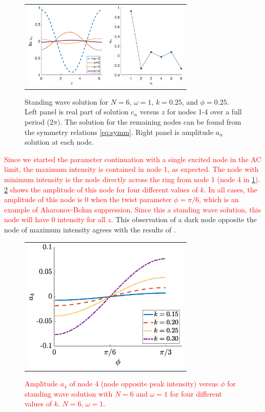 \documentclass[reprint, amsmath,amssymb,aps,pra]{revtex4-2}
\renewcommand{\revised}[1]{ \textcolor{red}{#1} }
\begin{document}
\begin{figure}
\begin{center}
\begin{tabular}{c}
\includegraphics[width=8cm]{twist025.eps}
\end{tabular}
\end{center}
\caption{Standing wave solution for $N = 6$, $\omega = 1$, $k = 0.25$, and $\phi = 0.25$. Left panel is real part of solution $c_n$ versus $z$ for nodes 1-4 over a full period ($2 \pi)$. The solution for the remaining nodes can be found from the symmetry relations \cref{eq:symm}. Right panel is amplitude $a_n$ solution at each node.}
\label{fig:twist025}
\end{figure}

\revised{Since we started the parameter continuation with a single excited node in the AC limit, the maximum intensity is contained in node 1, as expected. The node with minimum intensity is the node directly across the ring from node 1 (node 4 in \cref{fig:twist025}). \cref{fig:ABsuppression} shows the amplitude of this node for four different values of $k$. In all cases, the amplitude of this node is 0 when the twist parameter $\phi = \pi/6$, which is an example of Aharonov-Bohm suppression. Since this a standing wave solution, this node will have 0 intensity for all $z$.} This observation of a dark node opposite the node of maximum intensity agrees with the results of \cite{castro2016,Parto2017}.

\begin{figure}
    \begin{center}
    \begin{tabular}{c}
    \includegraphics[width=8cm]{images/ABsuppression.eps}
    \end{tabular}
    \end{center}
    \caption{\revised{Amplitude $a_4$ of node 4 (node opposite peak intensity) versus $\phi$ for standing wave solution with $N=6$ and $\omega=1$ for four different values of $k$. $N=6$, $\omega=1$.}}
    \label{fig:ABsuppression}
\end{figure}
\end{document}
